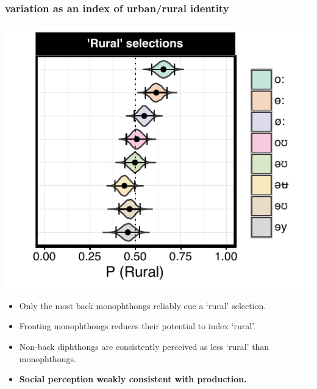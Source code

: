 \documentclass[a0,portrait]{a0poster}
\begin{document}
\begin{multicols*}{3}
\subsubsection*{ variation as an index of urban/rural identity}
\begin{minipage}{0.2\textwidth}
\hspace*{-1cm}
\includegraphics[scale=2.2]{ow_rural_effects.pdf}
\end{minipage}
\hspace*{1cm}
\begin{minipage}{0.12\textwidth}
\raggedright
\begin{itemize}
\item{Only the most back monophthongs reliably cue a `rural' selection.}
\item{Fronting monophthongs reduces their potential to index `rural'.}
\item{Non-back diphthongs are consistently perceived as less `rural' than monophthongs.}
\end{itemize}
\end{minipage}
\begin{itemize}
\item{\textbf{Social perception weakly consistent with production.}}
\end{itemize}


\end{multicols*}
\end{document}
